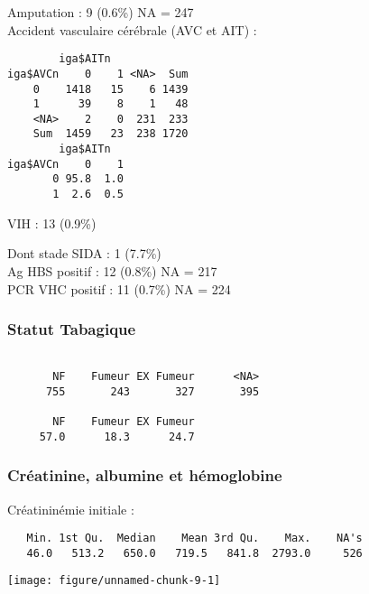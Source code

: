 \documentclass[11pt,a4paper]{article}\usepackage[]{graphicx}\usepackage[]{color}
\makeatletter
\def\maxwidth{ %
  \ifdim\Gin@nat@width>\linewidth
    \linewidth
  \else
    \Gin@nat@width
  \fi
}
\newenvironment{kframe}{%
 \def\at@end@of@kframe{}%
 \ifinner\ifhmode%
  \def\at@end@of@kframe{\end{minipage}}%
  \begin{minipage}{\columnwidth}%
 \fi\fi%
 \def\FrameCommand##1{\hskip\@totalleftmargin \hskip-\fboxsep
 \colorbox{shadecolor}{##1}\hskip-\fboxsep
     \hskip-\linewidth \hskip-\@totalleftmargin \hskip\columnwidth}%
 \MakeFramed {\advance\hsize-\width
   \@totalleftmargin\z@ \linewidth\hsize
   \@setminipage}}%
 {\par\unskip\endMakeFramed%
 \at@end@of@kframe}
\newenvironment{knitrout}{}{} %
\makeatother
\begin{document}
Amputation : 9 (0.6\%) NA = 247
~\\

Accident vasculaire cérébrale (AVC et AIT) :

\begin{knitrout}
\color{fgcolor}\begin{kframe}
\begin{verbatim}
        iga$AITn
iga$AVCn    0    1 <NA>  Sum
    0    1418   15    6 1439
    1      39    8    1   48
    <NA>    2    0  231  233
    Sum  1459   23  238 1720
        iga$AITn
iga$AVCn    0    1
       0 95.8  1.0
       1  2.6  0.5
\end{verbatim}
\end{kframe}
\end{knitrout}

VIH : 13 (0.9\%)

Dont stade SIDA : 1 (7.7\%)
~\\

Ag HBS positif : 12 (0.8\%) NA = 217
~\\

PCR VHC positif : 11 (0.7\%) NA = 224


    \subsubsection{Statut Tabagique}

\begin{knitrout}
\color{fgcolor}\begin{kframe}
\begin{verbatim}

       NF    Fumeur EX Fumeur      <NA> 
      755       243       327       395 

       NF    Fumeur EX Fumeur 
     57.0      18.3      24.7 
\end{verbatim}
\end{kframe}
\end{knitrout}

    \subsubsection{Créatinine, albumine et hémoglobine}

Créatininémie initiale :

\begin{knitrout}
\color{fgcolor}\begin{kframe}
\begin{verbatim}
   Min. 1st Qu.  Median    Mean 3rd Qu.    Max.    NA's 
   46.0   513.2   650.0   719.5   841.8  2793.0     526 
\end{verbatim}
\end{kframe}
\texttt{[image: figure/unnamed-chunk-9-1]} 

\end{knitrout}
\end{document}
